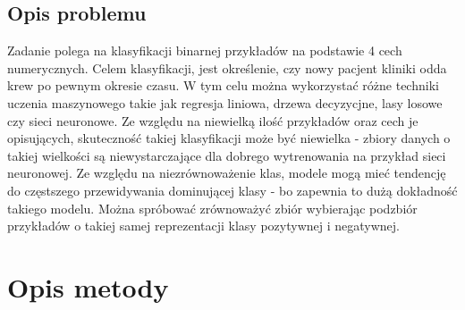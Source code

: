 \documentclass[11pt, a4paper, notitlepage]{report}
\begin{document}
\section{Opis problemu}
	Zadanie polega na klasyfikacji binarnej przykładów na podstawie 4 cech numerycznych. Celem klasyfikacji, jest określenie, czy nowy pacjent kliniki odda krew po pewnym okresie czasu. W tym celu można wykorzystać różne techniki uczenia maszynowego 
	takie jak regresja liniowa, drzewa decyzycjne, lasy losowe czy sieci neuronowe. Ze względu na niewielką ilość przykładów oraz cech je opisujących, skuteczność takiej klasyfikacji może być niewielka - zbiory danych o takiej wielkości są niewystarczające 
	dla dobrego wytrenowania na przykład sieci neuronowej. Ze względu na niezrównoważenie klas, modele mogą mieć tendencję do częstszego przewidywania dominującej klasy - bo zapewnia to dużą dokładność takiego modelu. Można spróbować zrównoważyć
	zbiór wybierając podzbiór przykładów o takiej samej reprezentacji klasy pozytywnej i negatywnej.

\chapter{Opis metody}
\end{document}
